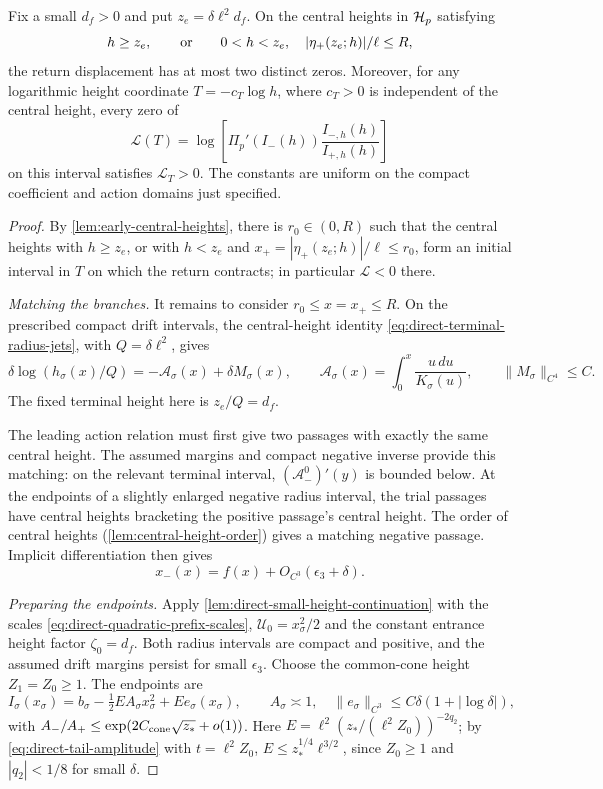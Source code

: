 \begin{lemma}
\label{lem:direct-quadratic-prefix}
Fix a small \(d_f>0\) and put \(z_e=\delta\ell^2d_f\).
On the central heights in \(\mathcal H_p\) satisfying
\[
 h\ge z_e,\qquad\hbox{or}\qquad
 0<h<z_e,\quad |\eta_+(z_e;h)|/\ell\le R,
\]
the return displacement has at most two distinct zeros.
Moreover, for any logarithmic height coordinate \(T=-c_T\log h\),
where \(c_T>0\)
is independent of the central height, every zero of
\[
 \mathcal L(T)=\log\!\left[
       \Pi_p'(I_-(h))\frac{I_{-,h}(h)}{I_{+,h}(h)}\right]
\]
on this interval satisfies \(\mathcal L_T>0\).
The constants are uniform on the compact coefficient and
action domains just specified.
\end{lemma}

\begin{proof}
By \cref{lem:early-central-heights}, there is \(r_0\in(0,R)\) such that
the central heights with \(h\ge z_e\), or with \(h<z_e\) and
\(x_+=|\eta_+(z_e;h)|/\ell\le r_0\), form an initial interval in \(T\) on
which the return contracts; in particular \(\mathcal L<0\) there.

\emph{Matching the branches.}
It remains to consider \(r_0\le x=x_+\le R\). On the prescribed
compact drift intervals, the central-height identity
\eqref{eq:direct-terminal-radius-jets}, with \(Q=\delta\ell^2\), gives
\[
 \delta\log(h_\sigma(x)/Q)
 =-\mathcal A_\sigma(x)+\delta M_\sigma(x),\qquad
 \mathcal A_\sigma(x)=\int_0^x\frac{u\,du}{K_\sigma(u)},\qquad
 \|M_\sigma\|_{C^4}\le C .
\]
The fixed terminal height here is \(z_e/Q=d_f\).

The leading action relation must first give two passages with exactly
the same central height. The assumed margins and compact negative
inverse provide this matching: on the relevant terminal interval,
\((\mathcal A_-^0)'(y)\) is bounded below. At the endpoints of a slightly
enlarged negative radius
interval, the trial passages have central heights bracketing the
positive passage's central height. The order of central heights
(\cref{lem:central-height-order}) gives a matching negative passage.
Implicit differentiation then gives
\begin{equation}
\label{eq:direct-quadratic-action-relation}
 x_-(x)=f(x)+O_{C^3}(\epsilon_3+\delta).
\end{equation}

\emph{Preparing the endpoints.}
Apply \cref{lem:direct-small-height-continuation} with the scales
\eqref{eq:direct-quadratic-prefix-scales},
\(\mathcal U_0=x_\sigma^2/2\) and the constant entrance height factor
\(\zeta_0=d_f\). Both radius intervals are compact and positive, and
the assumed drift margins persist for small \(\epsilon_3\).
Choose the common-cone height \(Z_1=Z_0\ge1\). The endpoints are
\[
 I_\sigma(x_\sigma)=b_\sigma-\tfrac12EA_\sigma x_\sigma^2
                        +Ee_\sigma(x_\sigma),\qquad
 A_\sigma\asymp1,\quad
 \|e_\sigma\|_{C^3}\le C\delta(1+|\log\delta|),
\]
with \(A_-/A_+\le\exp(2C_{\rm cone}\sqrt{z_*}+o(1))\).
Here \(E=\ell^2(z_*/(\ell^2Z_0))^{-2q_2}\); by
\eqref{eq:direct-tail-amplitude} with \(t=\ell^2Z_0\),
\(E\le z_*^{1/4}\ell^{3/2}\), since \(Z_0\ge1\) and
\(|q_2|<1/8\) for small \(\delta\).


\end{proof}
